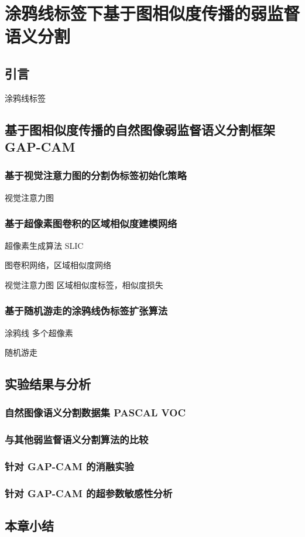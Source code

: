 \chapter{涂鸦线标签下基于图相似度传播的弱监督语义分割}
\section{引言}
涂鸦线标签
\section{基于图相似度传播的自然图像弱监督语义分割框架 GAP-CAM}
\subsection{基于视觉注意力图的分割伪标签初始化策略}
视觉注意力图
\subsection{基于超像素图卷积的区域相似度建模网络}
超像素生成算法 SLIC
\par
图卷积网络，区域相似度网络
\par
视觉注意力图 \rightarrow 区域相似度标签，相似度损失
\subsection{基于随机游走的涂鸦线伪标签扩张算法}
涂鸦线 \rightarrow 多个超像素
\par
随机游走
\section{实验结果与分析}
\subsection{自然图像语义分割数据集 PASCAL VOC}
\subsection{与其他弱监督语义分割算法的比较}
\subsection{针对 GAP-CAM 的消融实验}
\subsection{针对 GAP-CAM 的超参数敏感性分析}
\section{本章小结}
